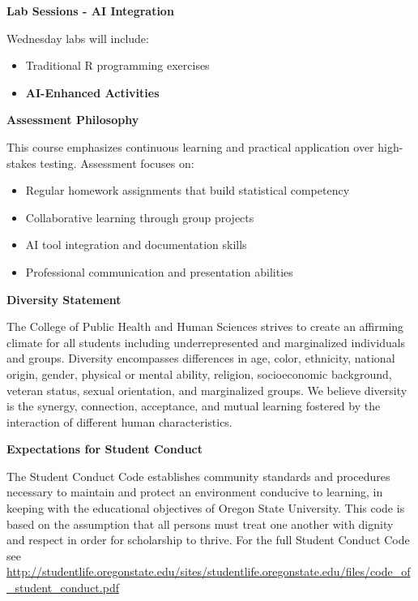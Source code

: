\documentclass[11pt]{article}
\begin{document}
\vspace{8pt}

\noindent\textbf{Lab Sessions - AI Integration}

Wednesday labs will include:
\begin{itemize}[leftmargin=20pt]
\item Traditional R programming exercises
\item \textcolor{aiblue}{\textbf{AI-Enhanced Activities}}
\end{itemize}

\vspace{8pt}

\noindent\textbf{Assessment Philosophy}

This course emphasizes continuous learning and practical application over high-stakes testing. Assessment focuses on:
\begin{itemize}[leftmargin=20pt]
\item Regular homework assignments that build statistical competency
\item Collaborative learning through group projects
\item AI tool integration and documentation skills
\item Professional communication and presentation abilities
\end{itemize}

\vspace{8pt}

\noindent\textbf{Diversity Statement}

The College of Public Health and Human Sciences strives to create an affirming climate for all students including underrepresented and marginalized individuals and groups. Diversity encompasses differences in age, color, ethnicity, national origin, gender, physical or mental ability, religion, socioeconomic background, veteran status, sexual orientation, and marginalized groups. We believe diversity is the synergy, connection, acceptance, and mutual learning fostered by the interaction of different human characteristics.

\vspace{8pt}

\noindent\textbf{Expectations for Student Conduct}

The Student Conduct Code establishes community standards and procedures necessary to maintain and protect an environment conducive to learning, in keeping with the educational objectives of Oregon State University. This code is based on the assumption that all persons must treat one another with dignity and respect in order for scholarship to thrive. For the full Student Conduct Code see \url{http://studentlife.oregonstate.edu/sites/studentlife.oregonstate.edu/files/code_of_student_conduct.pdf}
\end{document}
